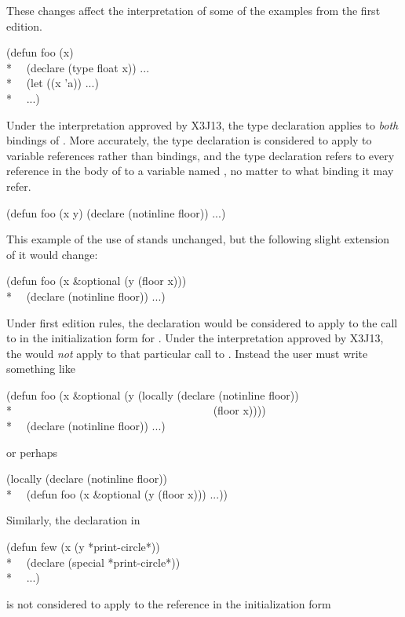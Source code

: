 \begin{defspec}
\begin{new}
These changes affect the interpretation of some of the examples from the
first edition.
\begin{lisp}
(defun foo (x) \\*
~~(declare (type float x)) ... \\*
~~(let ((x 'a)) ...) \\*
~~...)
\end{lisp}
Under the interpretation approved by X3J13, the type
declaration applies to {\it both} bindings of .
More accurately, the type declaration is considered to apply to
variable references rather than bindings, and the type declaration refers
to every reference in the body of  to a variable named ,
no matter to what binding it may refer.
\begin{lisp}
(defun foo (x y) (declare (notinline floor)) ...)
\end{lisp}
This example of the use of  stands unchanged, but the following
slight extension of it would change:
\begin{lisp}
(defun foo (x \&optional (y (floor x))) \\*
~~(declare (notinline floor)) ...)
\end{lisp}
Under first edition rules, the  declaration would be
considered to apply to the call to  in the initialization
form for .  Under the interpretation approved by X3J13, the
 would {\it not} apply to that particular call to .
Instead the user must write something like
\begin{lisp}
(defun foo (x \&optional (y (locally (declare (notinline floor)) \\*
~~~~~~~~~~~~~~~~~~~~~~~~~~~~~~~~~~~~(floor x)))) \\*
~~(declare (notinline floor)) ...)
\end{lisp}
or perhaps
\begin{lisp}
(locally (declare (notinline floor)) \\*
~~(defun foo (x \&optional (y (floor x))) ...))
\end{lisp}
Similarly, the  declaration in
\begin{lisp}
(defun few (x  (y *print-circle*)) \\*
~~(declare (special *print-circle*)) \\*
~~...)
\end{lisp}
is not considered to apply to the reference in the initialization form

\end{new}
\end{defspec}
